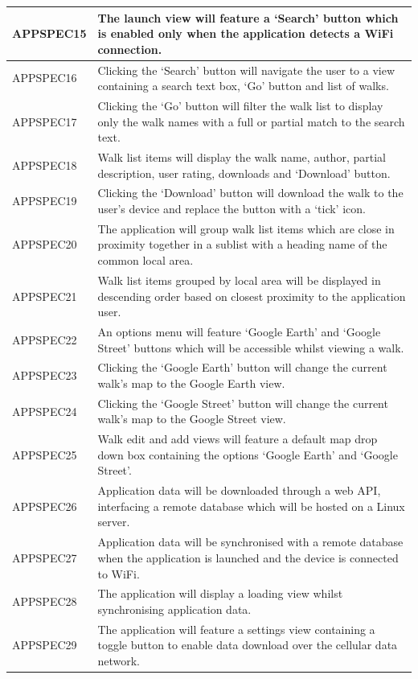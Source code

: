 \documentclass[11pt,a4paper]{article}
\begin{document}
\begin{longtable}{|p{2.5cm}p{13cm}|}
APPSPEC15 & The launch view will feature a `Search' button which is enabled only when the application detects a WiFi connection. \\ \hline
APPSPEC16 & Clicking the `Search' button will navigate the user to a view containing a search text box, `Go' button and list of walks. \\ \hline
APPSPEC17 & Clicking the `Go' button will filter the walk list to display only the walk names with a full or partial match to the search text. \\ \hline
APPSPEC18 & Walk list items will display the walk name, author, partial description, user rating, downloads and `Download' button. \\ \hline
APPSPEC19 & Clicking the `Download' button will download the walk to the user's device and replace the button with a `tick' icon. \\ \hline
APPSPEC20 & The application will group walk list items which are close in proximity together in a sublist with a heading name of the common local area. \\ \hline
APPSPEC21 & Walk list items grouped by local area will be displayed in descending order based on closest proximity to the application user. \\ \hline
APPSPEC22 & An options menu will feature `Google Earth' and `Google Street' buttons which will be accessible whilst viewing a walk. \\ \hline
APPSPEC23 & Clicking the `Google Earth' button will change the current walk's map to the Google Earth view. \\ \hline
APPSPEC24 & Clicking the `Google Street' button will change the current walk's map to the Google Street view. \\ \hline
APPSPEC25 & Walk edit and add views will feature a default map drop down box containing the options `Google Earth' and `Google Street'. \\ \hline
APPSPEC26 & Application data will be downloaded through a web API, interfacing a remote database which will be hosted on a Linux server.  \\ \hline
APPSPEC27 & Application data will be synchronised with a remote database when the application is launched and the device is connected to WiFi. \\ \hline
APPSPEC28 & The application will display a loading view whilst synchronising application data. \\ \hline
APPSPEC29 & The application will feature a settings view containing a toggle button to enable data download over the cellular data network. \\ \hline

\end{longtable}
\end{document}
